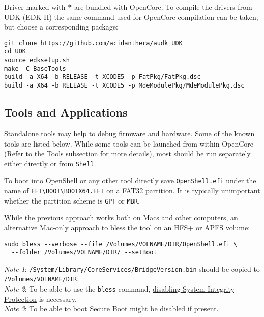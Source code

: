 \documentclass[]{article}
\begin{document}
Driver marked with \textbf{*} are bundled with OpenCore.
To compile the drivers from UDK (EDK II) the same command used for
OpenCore compilation can be taken, but choose a corresponding package:
\begin{lstlisting}[label=compileudk, style=ocbash]
git clone https://github.com/acidanthera/audk UDK
cd UDK
source edksetup.sh
make -C BaseTools
build -a X64 -b RELEASE -t XCODE5 -p FatPkg/FatPkg.dsc
build -a X64 -b RELEASE -t XCODE5 -p MdeModulePkg/MdeModulePkg.dsc
\end{lstlisting}

\subsection{Tools and Applications}\label{uefitools}

Standalone tools may help to debug firmware and hardware. Some of the known tools are listed below.
While some tools can be launched from within OpenCore (Refer to the \hyperref[misctools]{Tools} subsection
for more details), most should be run separately either directly or from \texttt{Shell}.

To boot into OpenShell or any other tool directly save \texttt{OpenShell.efi}
under the name of \texttt{EFI\textbackslash BOOT\textbackslash BOOTX64.EFI}
on a FAT32 partition. It is typically unimportant whether the partition scheme
is \texttt{GPT} or \texttt{MBR}.

While the previous approach works both on Macs and other computers,
an alternative Mac-only approach to bless the tool on an HFS+ or APFS
volume:

\begin{lstlisting}[caption=Blessing tool, label=blesstool, style=ocbash]
sudo bless --verbose --file /Volumes/VOLNAME/DIR/OpenShell.efi \
  --folder /Volumes/VOLNAME/DIR/ --setBoot
\end{lstlisting}

\emph{Note 1}: \texttt{/System/Library/CoreServices/BridgeVersion.bin} should be copied
  to \texttt{/Volumes/VOLNAME/DIR}. \\
\emph{Note 2}: To be able to use the \texttt{bless} command,
  \href{https://developer.apple.com/library/archive/documentation/Security/Conceptual/System_Integrity_Protection_Guide/ConfiguringSystemIntegrityProtection/ConfiguringSystemIntegrityProtection.html}{disabling System Integrity Protection} is necessary. \\
\emph{Note 3}: To be able to boot \href{https://support.apple.com/HT208330}{Secure Boot}
  might be disabled if present.
\end{document}
